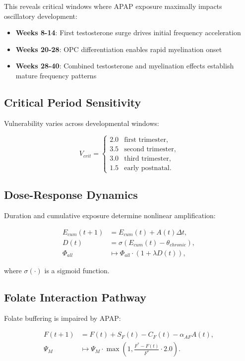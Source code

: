 \documentclass[11pt]{article}
\let\oldsubsection\subsection
\renewcommand{\subsection}[1]{\oldsubsection{#1}\setlength{\leftskip}{0.75em}}
\begin{document}
This reveals critical windows where APAP exposure maximally impacts oscillatory development:
\begin{itemize}
\item \textbf{Weeks 8-14}: First testosterone surge drives initial frequency acceleration
\item \textbf{Weeks 20-28}: OPC differentiation enables rapid myelination onset
\item \textbf{Weeks 28-40}: Combined testosterone and myelination effects establish mature frequency patterns
\end{itemize}

\subsection{Critical Period Sensitivity}
Vulnerability varies across developmental windows:

\[
V_{crit} = \begin{cases}
2.0 & \text{first trimester}, \\
3.5 & \text{second trimester}, \\
3.0 & \text{third trimester}, \\
1.5 & \text{early postnatal}.
\end{cases}
\]

\subsection{Dose-Response Dynamics}
Duration and cumulative exposure determine nonlinear amplification:

\begin{align}
E_{cum}(t+1) &= E_{cum}(t) + A(t)\Delta t, \\
D(t) &= \sigma\left(E_{cum}(t) - \theta_{chronic}\right), \\
\Phi_{all} &\mapsto \Phi_{all} \cdot (1 + \lambda D(t)),
\end{align}

where $\sigma(\cdot)$ is a sigmoid function.

\subsection{Folate Interaction Pathway}
Folate buffering is impaired by APAP:

\begin{align}
F(t+1) &= F(t) + S_F(t) - C_F(t) - \alpha_{AF}A(t), \\
\Psi_M &\mapsto \Psi_M \cdot \max\left(1, \frac{F^* - F(t)}{F^*} \cdot 2.0\right).
\end{align}
\end{document}
